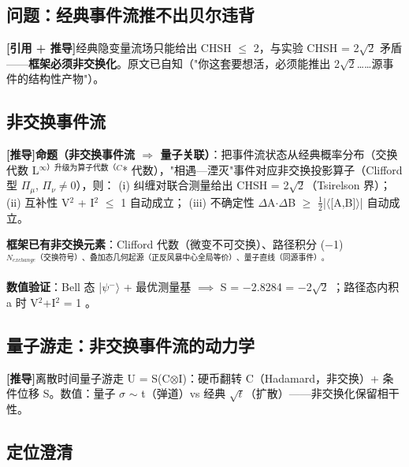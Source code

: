 \documentclass[UTF8,fontset=windows]{csoarticle}
\newcommand{\mtag}[1]{\textbf{[#1]}}
\newcommand{\up}[1]{\ensuremath{^{#1}}}
\newcommand{\down}[1]{\ensuremath{_{#1}}}
\begin{document}
\subsection{问题：经典事件流推不出贝尔违背}

\mtag{引用 + 推导}经典隐变量流场只能给出 CHSH \ensuremath{\leq} 2，与实验 CHSH = 2\ensuremath{\sqrt{2}} 矛盾------\textbf{框架必须非交换化}。原文已自知（"你这套要想活，必须能推出 2\ensuremath{\sqrt{2}}\ldots{}\ldots{}源事件的结构性产物"）。

\subsection{非交换事件流}

\mtag{推导}\textbf{命题（非交换事件流 \ensuremath{\Rightarrow} 量子关联）}：把事件流状态从经典概率分布（交换代数 L\up{\infty{}）升级为算子代数（C}* 代数），"相遇---湮灭"事件对应非交换投影算子（Clifford 型 {\ensuremath{\Pi}\down{\mu{}}, \ensuremath{\Pi}\down{\nu{}}}\ensuremath{\neq}0），则：
(i) 纠缠对联合测量给出 CHSH = 2\ensuremath{\sqrt{2}}（Tsirelson 界）；
(ii) 互补性 V\up{2} + I\up{2} \ensuremath{\leq} 1 自动成立；
(iii) 不确定性 \ensuremath{\Delta}A\ensuremath{\cdot}\ensuremath{\Delta}B \ensuremath{\geq} \ensuremath{\tfrac12}|\ensuremath{\langle}[A,B]\ensuremath{\rangle}| 自动成立。

\textbf{框架已有非交换元素}：Clifford 代数（微变不可交换）、路径积分 (\ensuremath{-}1)\up{N\down{exchange}（交换符号）、叠加态几何起源（正反风暴中心全局等价）、量子直线（同源事件）。}

\textbf{数值验证}：Bell 态 |\ensuremath{\psi}\up{-}\ensuremath{\rangle} + 最优测量基 \ensuremath{\implies} S = \ensuremath{-}2.8284 = \ensuremath{-}2\ensuremath{\sqrt{2}} \checkmark；路径态内积 a 时 V\up{2}+I\up{2} = 1 \checkmark。

\subsection{量子游走：非交换事件流的动力学}

\mtag{推导}离散时间量子游走 U = S(C\ensuremath{\otimes}I)：硬币翻转 C（Hadamard，非交换）+ 条件位移 S。数值：量子 \ensuremath{\sigma} \ensuremath{\sim} t（弹道）vs 经典 \ensuremath{\sqrt{t}}（扩散）------非交换化保留相干性。

\subsection{定位澄清}
\end{document}
